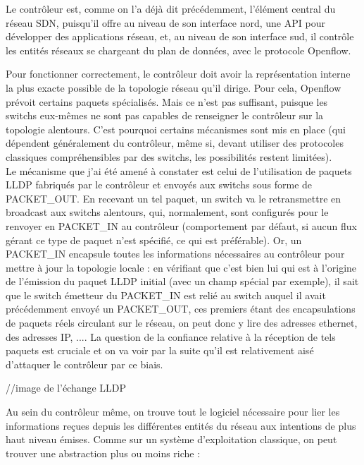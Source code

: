 Le contrôleur est, comme on l'a déjà dit précédemment, l'élément central du réseau SDN, puisqu'il offre au niveau de son interface nord, une API pour développer des applications réseau, et, au niveau de son interface sud, il contrôle les entités réseaux se chargeant du plan de données, avec le protocole Openflow.

Pour fonctionner correctement, le contrôleur doit avoir la représentation interne la plus exacte possible de la topologie réseau qu'il dirige. Pour cela, Openflow prévoit certains paquets spécialisés. Mais ce n'est pas suffisant, puisque les switchs eux-mêmes ne sont pas capables de renseigner le contrôleur sur la topologie alentours. C'est pourquoi certains mécanismes sont mis en place (qui dépendent généralement du contrôleur, même si, devant utiliser des protocoles classiques compréhensibles par des switchs, les possibilités restent limitées).\\
Le mécanisme que j'ai été amené à constater est celui de l'utilisation de paquets LLDP fabriqués par le contrôleur et envoyés aux switchs sous forme de PACKET\_OUT. En recevant un tel paquet, un switch va le retransmettre en broadcast aux switchs alentours, qui, normalement, sont configurés pour le renvoyer en PACKET\_IN au contrôleur (comportement par défaut, si aucun flux gérant ce type de paquet n'est spécifié, ce qui est préférable). Or, un PACKET\_IN encapsule toutes les informations nécessaires au contrôleur pour mettre à jour la topologie locale : en vérifiant que c'est bien lui qui est à l'origine de l'émission du paquet LLDP initial (avec un champ spécial par exemple), il sait que le switch émetteur du PACKET_IN est relié au switch auquel il avait précédemment envoyé un PACKET_OUT, ces premiers étant des encapsulations de paquets réels circulant sur le réseau, on peut donc y lire des adresses ethernet, des adresses IP, .... La question de la confiance relative à la réception de tels paquets est cruciale et on va voir par la suite qu'il est relativement aisé d'attaquer le contrôleur par ce biais.

//image de l'échange LLDP

Au sein du contrôleur même, on trouve tout le logiciel nécessaire pour lier les informations reçues depuis les différentes entités du réseau aux intentions de plus haut niveau émises. Comme sur un système d'exploitation classique, on peut trouver une abstraction plus ou moins riche : 